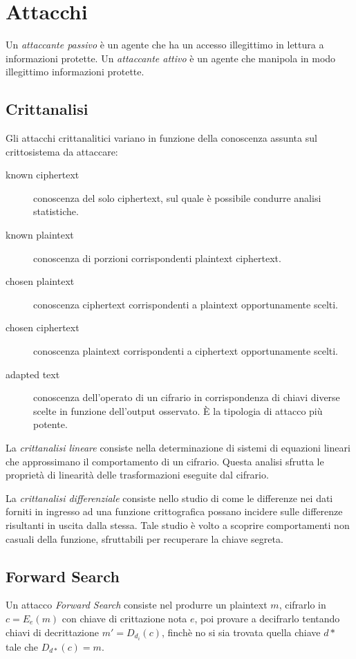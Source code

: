 \chapter{Attacchi}
\label{chp:attacks}

Un \textit{attaccante passivo} è un agente che ha un accesso illegittimo in lettura a informazioni protette.
Un \textit{attaccante attivo} è un agente che manipola in modo illegittimo informazioni protette.

\section{Crittanalisi}
Gli attacchi crittanalitici variano in funzione della conoscenza assunta sul crittosistema da attaccare:

\begin{description}
  \item[known ciphertext] conoscenza del solo ciphertext, sul quale è possibile condurre analisi statistiche.
  \item[known plaintext] conoscenza di porzioni corrispondenti  plaintext ciphertext.
  \item[chosen plaintext] conoscenza ciphertext corrispondenti a plaintext opportunamente scelti.
  \item[chosen ciphertext] conoscenza plaintext corrispondenti a ciphertext opportunamente scelti.
  \item[adapted text] conoscenza dell'operato di un cifrario in corrispondenza di chiavi diverse scelte in funzione dell'output osservato. È la tipologia di attacco più potente.
\end{description}

La \textit{crittanalisi lineare} consiste nella determinazione di sistemi di equazioni lineari che approssimano il comportamento di un cifrario. Questa analisi sfrutta le proprietà di linearità delle trasformazioni eseguite dal cifrario.

La \textit{crittanalisi differenziale} consiste nello studio di come le differenze nei dati forniti in ingresso ad una funzione crittografica possano incidere sulle differenze risultanti in uscita dalla stessa. Tale studio è volto a scoprire comportamenti non casuali della funzione, sfruttabili per recuperare la chiave segreta.

\section{Forward Search}
Un attacco \textit{Forward Search} consiste nel produrre un plaintext $m$, cifrarlo in $c=E_{e}(m)$ con chiave di crittazione nota $e$, poi provare a decifrarlo tentando chiavi di decrittazione $m'=D_{d_{i}}(c)$, finchè no si sia trovata quella chiave $d*$ tale che $D_{d*}(c)=m$.

